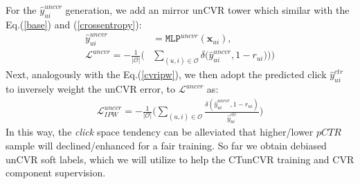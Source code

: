 %
For the $\hat{y}^{uncvr}_{ui}$ generation, we add an mirror unCVR tower which similar with the Eq.(\ref{base}) and (\ref{crossentropy}):
%
%
%
% 
%
%
% 
\begin{equation}
\begin{split}
\hat{y}^{uncvr}_{ui} &= \texttt{MLP}^{uncvr}(\mathbf{x}_{ui}), \\
\mathcal{L}^{uncvr} = - \frac{1}{|\mathcal{O}|}\Big(&\sum_{(u,i)\in\mathcal{O}}\delta\big(\hat{y}^{uncvr}_{ui}, 1-r_{ui})\big)\Big)
\end{split}
\label{uncvr}
\end{equation}
% 
Next, analogously with the Eq.(\ref{cvripw}), we then adopt the predicted click $\hat{y}^{ctr}_{ui}$ to inversely weight the unCVR error, to $\mathcal{L}^{uncvr}$ as:
% 
\begin{equation}
\begin{split}
\mathcal{L}^{uncvr}_{IPW} = - \frac{1}
{|\mathcal{O}|}\Big(\sum_{(u,i)\in\mathcal{O}}\frac{\delta(\hat{y}^{uncvr}_{ui}, 1-r_{ui})}{\hat{y}^{ctr}_{ui}}\Big)
\end{split}
\label{uncvr}
\end{equation}
In this way, the \textit{click} space tendency can be alleviated that higher/lower $pCTR$ sample will declined/enhanced for a fair training. So far we obtain debiased unCVR soft labels, which we will utilize to help the CTunCVR training and CVR component supervision.



